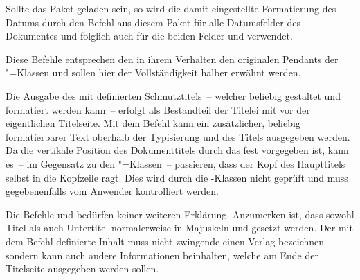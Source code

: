 \begin{Declaration*}{}
\begin{Declaration*}{}
\begin{Declaration*}{}
\begin{Declaration}{}
\begin{Declaration}{}
Sollte das Paket  geladen sein, so wird die damit eingestellte 
Formatierung des Datums durch den Befehl  aus diesem Paket für 
alle Datumsfelder des Dokumentes und folglich auch für die beiden Felder 
 und  verwendet.
\end{Declaration}
\end{Declaration}
%

\begin{Declaration}{}
\begin{Declaration}{}
\begin{Declaration}{}
\begin{Declaration}{}
\begin{Declaration}{}
\begin{Declaration}{}
\begin{Declaration}{}
\begin{Declaration}{}
\begin{Declaration}{}
\printdeclarationlist%
%
Diese Befehle entsprechen den in ihrem Verhalten den originalen Pendants der 
\KOMAScript"=Klassen und sollen hier der Vollständigkeit halber erwähnt werden.

Die Ausgabe des mit  definierten Schmutztitels~-- welcher 
beliebig gestaltet und formatiert werden kann~-- erfolgt als Bestandteil der 
Titelei mit  vor der eigentlichen Titelseite. Mit dem Befehl 
 kann ein zusätzlicher, beliebig formatierbarer Text oberhalb 
der Typisierung und des Titels ausgegeben werden. Da die vertikale Position des 
Dokumenttitels durch das \CD fest vorgegeben ist, kann es~-- im Gegensatz zu 
den \KOMAScript"=Klassen~-- passieren, dass der Kopf des Haupttitels selbst in 
die Kopfzeile ragt. Dies wird durch die \TUDScript-Klassen nicht geprüft und 
muss gegebenenfalls vom Anwender kontrolliert werden.

Die Befehle  und  bedürfen keiner weiteren 
Erklärung. Anzumerken ist, dass sowohl Titel als auch Untertitel normalerweise 
in Majuskeln und \DIN gesetzt werden. Der mit dem Befehl  
definierte Inhalt muss nicht zwingende einen Verlag bezeichnen sondern kann 
auch andere Informationen beinhalten, welche am Ende der Titelseite ausgegeben 
werden sollen.


\end{Declaration}
\end{Declaration}
\end{Declaration}
\end{Declaration}
\end{Declaration}
\end{Declaration}
\end{Declaration}
\end{Declaration}
\end{Declaration}
\end{Declaration*}
\end{Declaration*}
\end{Declaration*}

